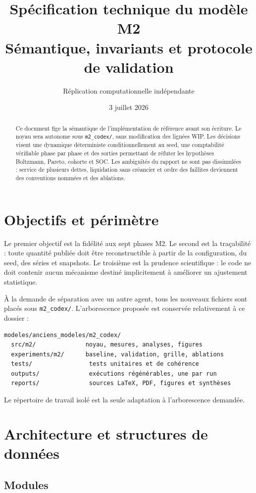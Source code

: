 \documentclass[11pt,a4paper]{article}
\title{Spécification technique du modèle M2\\
\large Sémantique, invariants et protocole de validation}
\author{Réplication computationnelle indépendante}
\date{3 juillet 2026}
\newcommand{\code}[1]{\texttt{#1}}
\begin{document}
\maketitle

\begin{abstract}
Ce document fige la sémantique de l'implémentation de référence avant son
écriture. Le noyau sera autonome sous \code{m2\_codex/}, sans modification des
lignées WIP. Les décisions visent une dynamique déterministe conditionnellement
au seed, une comptabilité vérifiable phase par phase et des sorties permettant
de réfuter les hypothèses Boltzmann, Pareto, cohorte et SOC. Les ambiguïtés du
rapport ne sont pas dissimulées : service de plusieurs dettes, liquidation sans
créancier et ordre des faillites deviennent des conventions nommées et des
ablations.
\end{abstract}

\tableofcontents

\section{Objectifs et périmètre}

Le premier objectif est la fidélité aux sept phases M2. Le second est la
traçabilité : toute quantité publiée doit être reconstructible à partir de la
configuration, du seed, des séries et snapshots. Le troisième est la prudence
scientifique : le code ne doit contenir aucun mécanisme destiné implicitement à
améliorer un ajustement statistique.

À la demande de séparation avec un autre agent, tous les nouveaux fichiers sont
placés sous \code{m2\_codex/}. L'arborescence proposée est conservée relativement
à ce dossier :
\begin{verbatim}
modeles/anciens_modeles/m2_codex/
  src/m2/              noyau, mesures, analyses, figures
  experiments/m2/      baseline, validation, grille, ablations
  tests/                tests unitaires et de cohérence
  outputs/              exécutions régénérables, une par run
  reports/              sources LaTeX, PDF, figures et synthèses
\end{verbatim}
Le répertoire de travail isolé est la seule adaptation à l'arborescence demandée.

\section{Architecture et structures de données}

\subsection{Modules}
\end{document}
